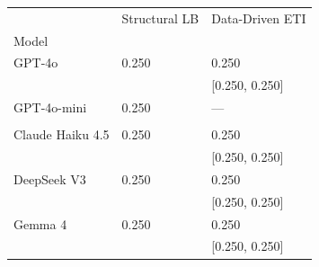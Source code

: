 \begin{tabular}{lll}
\toprule
 & Structural LB & Data-Driven ETI \\
Model &  &  \\
\midrule
GPT-4o & 0.250 & 0.250 \\
 &  & [0.250, 0.250] \\
GPT-4o-mini & 0.250 & — \\
 &  &  \\
Claude Haiku 4.5 & 0.250 & 0.250 \\
 &  & [0.250, 0.250] \\
DeepSeek V3 & 0.250 & 0.250 \\
 &  & [0.250, 0.250] \\
Gemma 4 & 0.250 & 0.250 \\
 &  & [0.250, 0.250] \\
\bottomrule
\end{tabular}
